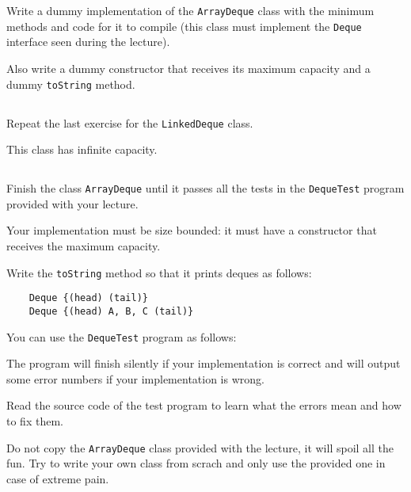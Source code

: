 \documentclass[a4paper, 11pt]{article}
\begin{document}
Write a dummy implementation of the \texttt{ArrayDeque} class with the minimum
methods and code for it to compile (this class must implement the
\texttt{Deque} interface seen during the lecture).

Also write a dummy constructor that receives its maximum capacity and a dummy
\verb+toString+ method.

\subsection{}

Repeat the last exercise for the \texttt{LinkedDeque} class.

This class has infinite capacity.

\subsection{}

Finish the class \texttt{ArrayDeque} until it passes all the tests in the
\verb+DequeTest+ program provided with your lecture.

Your implementation must be size bounded: it must have a constructor that
receives the maximum capacity.

Write the \verb+toString+ method so that it prints deques as follows:

\begin{verbatim}
    Deque {(head) (tail)}
    Deque {(head) A, B, C (tail)}
\end{verbatim}

You can use the \texttt{DequeTest} program as follows:


The program will finish silently if your implementation is correct and will
output some error numbers if your implementation is wrong.

Read the source code of the test program to learn what the errors mean
and how to fix them.

Do not copy the \texttt{ArrayDeque} class provided with the lecture, it will
spoil all the fun. Try to write your own class from scrach and only use the
provided one in case of extreme pain.

\subsection{}
\end{document}
